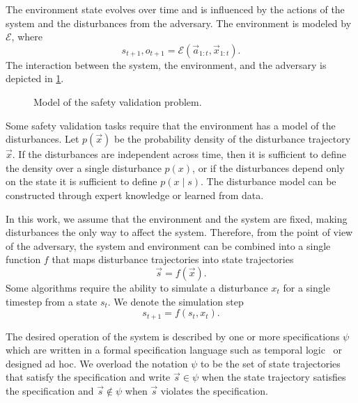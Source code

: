 The environment state evolves over time and is influenced by the actions of the system and the disturbances from the adversary. The environment is modeled by $\mathcal{E}$, where
\begin{equation}
    s_{t+1}, o_{t+1} = \mathcal{E}(\vec{a}_{1:t}, \vec{x}_{1:t}) \text{.} \label{eq:environment}
\end{equation} 
The interaction between the system, the environment, and the adversary is depicted in \cref{fig:problem}.

\begin{figure}[!t]
\centering
\resizebox{\columnwidth}{!}{}
\caption{Model of the safety validation problem.}
\label{fig:problem}
\end{figure}

Some safety validation tasks require that the environment has a model of the disturbances. Let $p(\vec{x})$ be the probability density of the disturbance trajectory $\vec{x}$. If the disturbances are independent across time, then it is sufficient to define the density over a single disturbance $p(x)$, or if the disturbances depend only on the state it is sufficient to define $p(x \mid s)$. The disturbance model can be constructed through expert knowledge or learned from data.

In this work, we assume that the environment and the system are fixed, making disturbances the only way to affect the system. Therefore, from the point of view of the adversary, the system and environment can be combined into a single function $f$ that maps disturbance trajectories into state trajectories
\begin{equation}
\vec{s} = f(\vec{x}) \text{.}
\end{equation}
Some algorithms require the ability to simulate a disturbance $x_t$ for a single timestep from a state $s_t$. We denote the simulation step
\begin{equation}
    s_{t+1} = f(s_t, x_t) \text{.}
\end{equation}

The desired operation of the system is described by one or more specifications $\psi$ which are  written in a formal specification language such as temporal logic~\cite{baier2008principles} or designed ad hoc. We overload the notation $\psi$ to be the set of state trajectories that satisfy the specification and write $\vec{s} \in \psi$ when the state trajectory satisfies the specification and $\vec{s} \not \in \psi$ when $\vec{s}$ violates the specification.

